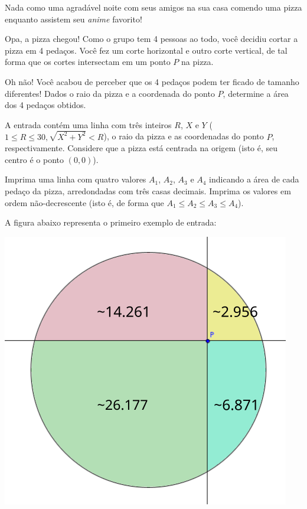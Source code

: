Nada como uma agradável noite com seus amigos na sua casa comendo uma pizza
enquanto assistem seu \textit{anime} favorito!

Opa, a pizza chegou! Como o grupo tem 4 pessoas ao todo, você decidiu cortar a
pizza em 4 pedaços. Você fez um corte horizontal e outro corte vertical, de tal
forma que os cortes intersectam em um ponto $P$ na pizza.

Oh não! Você acabou de perceber que os 4 pedaços podem ter ficado de tamanho
diferentes! Dados o raio da pizza e a coordenada do ponto $P$, determine a área
dos 4 pedaços obtidos.


A entrada contém uma linha com três inteiros $R$, $X$ e $Y$
($1 \leq R \leq 30, \sqrt{X^2 + Y^2} < R$), o raio da pizza e as coordenadas do ponto
$P$, respectivamente. Considere que a pizza está centrada na origem (isto é, seu
centro é o ponto $(0,0)$).


Imprima uma linha com quatro valores $A_1$, $A_2$, $A_3$ e $A_4$ indicando a área de cada
pedaço da pizza, arredondadas com três casas decimais. Imprima os valores em
ordem não-decrescente (isto é, de forma que $A_1 \leq A_2 \leq A_3 \leq A_4$).

A figura abaixo representa o primeiro exemplo de entrada:
\begin{center}
    \includegraphics[scale=1.25]{pizza.png}
\end{center}

